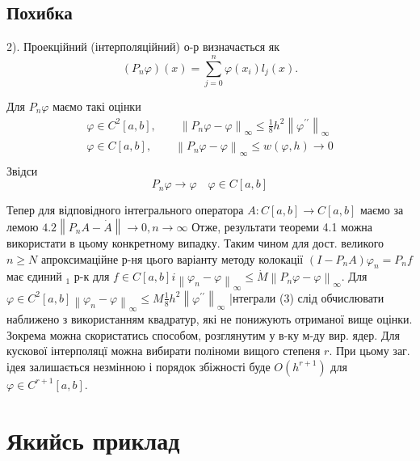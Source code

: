 \documentclass[14pt,a4paper]{extarticle}
\newcounter{e}
\begin{document}
 
 \subsection{Похибка}
 
 2). Проекційний (інтерполяційний) о-р визначається як 
 $$
 \left(P_{n} \varphi\right)(x)= \sum_{j=0}^{n} \varphi\left(x_{i}\right) l_{j}(x) .
 $$
 
 Для $P_{n} \varphi$ маємо такі оцінки 
 $$
 \begin{array}{l}
 	\displaystyle
	\varphi \in C^{2}[a, b], \quad \quad \left\|P_{n} \varphi-\varphi\right\|_{\infty} \leq \frac{1}{8} h^{2}\left\|\varphi^{\prime \prime}\right\|_{\infty}  
	\\[0.3cm]
 	
 	\displaystyle
	\varphi \in C[a, b], \quad \quad \left\|P_{n} \varphi-\varphi\right\|_{\infty} \leq w(\varphi, h) \rightarrow 0
	\\[0.3cm]	
\end{array}
 $$
 Звідси 
 $$ 
 P_{n} \varphi \rightarrow \varphi  \quad  \varphi \in C[a, b]
 $$
 
 Тепер для відповідного інтегрального оператора $A: C[a, b] \rightarrow C[a, b]$ маємо за лемою $4.2\left\|P_{n} A-\dot{A}\right\| \rightarrow 0, n \rightarrow \infty$
 Отже, результати теореми 4.1 можна використати в цьому конкретному випадку. Таким чином для дост. великого $n \geq N$ апроксимаційне р-ня цього варіанту методу колокації $\left(I-P_{n} A\right) \varphi_{n}=P_{n} f$ має єдиний $_{1}$ р-к для $f \in C[a, b] i\left\|\varphi_{n}-\varphi\right\|_{\infty} \leq \dot{M}\left\|P_{n} \varphi-\varphi\right\|_{\infty}$. Для
 $\varphi \in C^{2}[a, b]\left\|\varphi_{n}-\varphi\right\|_{\infty} \leq M \frac{1}{8} h^{2}\left\|\varphi^{\prime \prime}\right\|_{\infty}$
 |нтеграли (3) слід обчислювати наближено з використанням квадратур, які не понижують отриманої вище оцінки. Зокрема можна скористатись способом, розглянутим у в-ку м-ду вир. ядер.
 Для кускової інтерполяцї можна вибирати поліноми вищого степеня $r .$ При цьому заг. ідея залишається незмінною і порядок збіжності буде $O\left(h^{r+1}\right)$ для $\varphi \in C^{r+1}[a, b] .$
 
 
 \newpage
 \thispagestyle{empty}
 \section{Якийсь приклад}
 
  \newpage
\nocite{kress2012linear}
\printbibliography[title={Бібліографія}]
\end{document}
